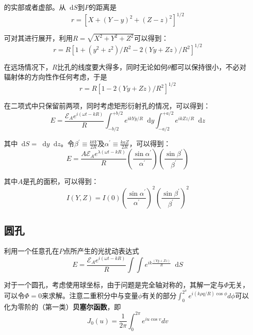 \documentclass[UTF8]{ctexart}
\newcommand*{\dif}{\mathop{}\!\mathrm{d}}
\begin{document}
\noindent 的实部或者虚部。从$ \dif S $到$ P $的距离是
\begin{equation}
r=\left[X+(Y-y)^{2}+(Z-z)^{2}\right]^{1 / 2}
\end{equation}

\noindent 可对其进行展开，利用$ R=\sqrt{X^{2}+Y^{2}+Z^{2}} $可以得到：
\begin{equation}
	r=R\left[1+\left(y^{2}+z^{2}\right) / R^{2}-2(Y y+Z z) / R^{2}\right]^{1 / 2}
\end{equation}

\noindent 在远场情况下，$ R $比孔的线度要大得多，同时无论如何$ \theta $都可以保持很小，不必对辐射体的方向性作任何考虑，于是
\begin{equation}
r=R\left[1-2(Y y+Z z) / R^{2}\right]^{1 / 2}
\end{equation}

\noindent 在二项式中只保留前两项，同时考虑矩形衍射孔的情况，可以得到：
\begin{equation}
E=\frac{\mathscr{E}_{A} e^{i(\omega t-k R)}}{R} \int_{-b / 2}^{+b / 2} e^{i k Y y / R} \dif y \int_{-a / 2}^{+a / 2} e^{i k Z z / R} \dif z
\end{equation}

\noindent 其中$ \dif S= \dif y \dif z $。令$ \beta^{\prime} \equiv \frac{k b Y}{2 R} $及$ \alpha^{\prime} \equiv \frac{k a Z}{2 R} $，可以得到：
\begin{equation}
	E=\frac{A \mathscr{E}_{A} e^{\lambda \left(\omega t- k R\right)}}{R} \left(\frac{\sin \alpha^{\prime}}{\alpha^{\prime}}\right)\left(\frac{\sin \beta^{\prime}}{\beta^{\prime}}\right)
\end{equation}

\noindent 其中$ A $是孔的面积，可以得到：
\begin{equation}
I(Y, Z)=I(0)\left(\frac{\sin \alpha^{\prime}}{\alpha^{\prime}}\right)^{2}\left(\frac{\sin \beta^{\prime}}{\beta^{\prime}}\right)^{2}
\end{equation}

	\subsection{圆孔}
	利用一个任意孔在$ P $点所产生的光扰动表达式
	\begin{equation}
		E=\frac{\mathscr{E}_{A} e^{i\left(\omega t- k R\right)}}{R} \int \int e^{ik \frac{\left(Y y+ Z z\right)}{R}} \dif S
	\end{equation}
	
\noindent 对于一个圆孔，考虑使用球坐标，由于问题是完全轴对称的，其解一定与$ \Phi $无关，可以令$ \Phi=0 $来求解。注意二重积分中与变量$ \phi $有关的部分$\int_{0}^{2^{\pi}} e^{i(k \rho q / R) \cos \phi} d \phi $可以化为零阶的（第一类）\textbf{贝塞尔函数}，即
\begin{equation}
J_{0}(u)=\frac{1}{2 \pi} \int_{0}^{2 \pi} e^{i u \cos v} d v
\end{equation}
\end{document}
